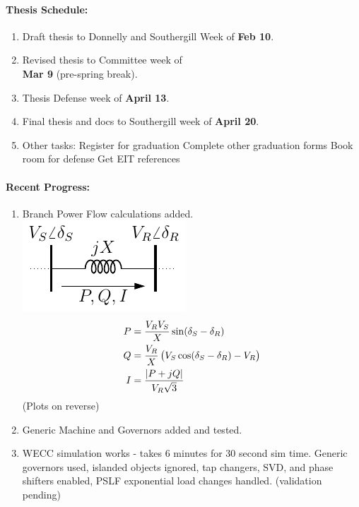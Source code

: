 \documentclass[12pt]{article}
\begin{document}
\begin{multicols}{2}
\raggedright
	\paragraph{Thesis Schedule:}
	\begin{enumerate}
\itemsep0em 
		\item Draft thesis to Donnelly and Southergill Week of\textbf{ Feb 10}.
		\item Revised thesis to Committee week of \\ \textbf{Mar 9} (pre-spring break).
		\item Thesis Defense week of \textbf{April 13}.
		\item Final thesis and docs to Southergill week of \textbf{April 20}.
\item Other tasks:
\subitem Register for graduation
\subitem Complete other graduation forms
\subitem Book room for defense
\subitem Get EIT references
\end{enumerate}

	\paragraph{Recent Progress:}
	\begin{enumerate}
\itemsep0em 
		\item Branch Power Flow calculations added. \\
\includegraphics[width=.75\linewidth]{../../models/2bus/2bus}
\begin{align}
P &= \dfrac{V_R V_S}{X} \sin(\delta_S - \delta_R)\\
Q &= \dfrac{V_R}{X} \left(V_S\cos(\delta_S - \delta_R)-V_R\right)\\
I &= \dfrac{\abs{P + jQ}}{V_R\sqrt{3}}
\end{align}
(Plots on reverse)
		\item Generic Machine and Governors added and tested.
		\item WECC simulation works - takes 6 minutes for 30 second sim time. Generic governors used, islanded objects ignored, tap changers, SVD, and phase shifters enabled, PSLF exponential load changes handled. (validation pending)


\end{enumerate}
\end{multicols}
\end{document}
